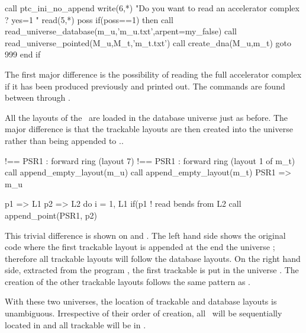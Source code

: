 {\begin{ptccode}[
  label={\ptctitle{\ptc{new_ptc_geometry.f90}\quad\small This program
                   describes the geometry of several \PTC\ lattices using two ``MAD universes.''}}
]
call ptc_ini_no_append \label{lin:init.layout2}
write(6,*) "Do you want to read an accelerator complex ? yes=1 "  \label{lin:read:uni1}
read(5,*) poss
if(poss==1) then
 call read_universe_database(m_u,'m_u.txt',arpent=my_false)
 call read_universe_pointed(M_u,M_t,'m_t.txt')
 call create_dna(M_u,m_t)
 goto 999
end if  \label{lin:read:uni2}
\end{ptccode}

The first major difference is the possibility of reading the full accelerator complex if it has been produced previously and printed out. 
The commands are found between  through . 

All the layouts of the \DNA\ are loaded in the database universe  just as before. The major difference is that the trackable layouts are then created into the universe  rather than being appended to ..

 
{\scriptsize
{}
\begin{ptccode}
!== PSR1 : forward ring  (layout 7)                       !== PSR1 : forward ring  (layout 1 of m_t)   \label{lin:dif:1}
call append_empty_layout(m_u)                             call append_empty_layout(m_t) \label{lin:dif:2}
PSR1 => m_u%

p1 => L1%
p2 => L2%
do i = 1, L1%
  if(p1%
    ! read bends from L2                                            
    call append_point(PSR1, p2)                                     
\end{ptccode}
}

This trivial difference is shown on  and . The left hand side shows the original code where the first trackable layout   is appended at the end the universe ; therefore all trackable layouts will follow the database layouts.  On the right hand side, extracted from the program , the first  trackable  is put in the universe . The creation of the other trackable layouts follows the same pattern as .

With these two universes, the location of trackable and database layouts is unambiguous. Irrespective of their order of creation, all \DNA\ will be sequentially located in  and all trackable will be in .

}
